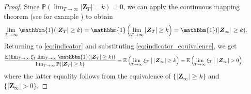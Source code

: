 \documentclass[preprint,3p,12pt]{elsarticle}
\theoremstyle{definition}
\begin{document}
\begin{proof}
Since $\mathbb{P}(\lim_{T \rightarrow \infty}|\boldsymbol{Z}_T| = k) = 0$, we can apply the continuous mapping theorem (see for example \cite[Lemma 5.3, p.\ 103]{kallenberg}) %
to obtain 
\begin{equation}
    \lim_{T \rightarrow \infty} \mathbbm{1}(|\boldsymbol{Z}_T| \ge k) = \mathbbm{1}\left(\lim_{T \rightarrow \infty} |\boldsymbol{Z}_T| \ge k\right)  = \mathbbm{1}( |\boldsymbol{Z}_{\infty}| \ge k). \label{eq:indicator_equivalence}
\end{equation}
Returning to \eqref{eq:indicator} and substituting \eqref{eq:indicator_equivalence}, we get
\begin{align*}
\frac{\mathbb{E}(\lim_{T \rightarrow \infty}\xi_{T} \lim_{T \rightarrow \infty}\mathbbm{1}(|\boldsymbol{Z}_T| \ge k))}{\lim_{T \rightarrow \infty}\mathbb{P}(|\boldsymbol{Z}_{T}| \ge k)} %
    & = \mathbb{E}\left(\lim_{T \rightarrow \infty}\xi_{T}\bigm| |\boldsymbol{Z}_{\infty}| \ge k\right)
    = \mathbb{E}\left(\lim_{T \rightarrow \infty}\xi_{T}\bigm| |\boldsymbol{Z}_{\infty}| > 0\right) %
\end{align*}
where the latter equality follows from the equivalence of $\{|\boldsymbol{Z}_{\infty}| \ge k\}$ and $\{|\boldsymbol{Z}_{\infty}| > 0\}$.
\end{proof}
\end{document}
